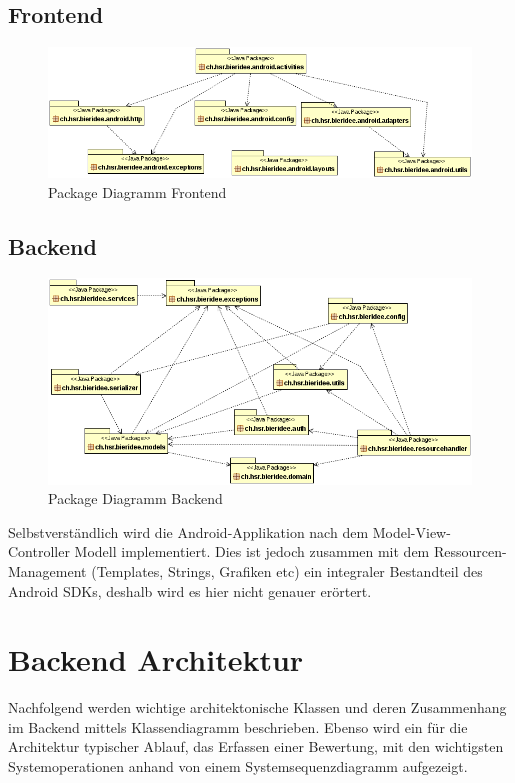 \documentclass[10pt,a4paper]{scrartcl}
\begin{document}
\subsection{Frontend}
\begin{figure}[H]
	\includegraphics[width=\textwidth]{Package-Diagramm-Front.png}
	\caption{Package Diagramm Frontend}
	\label{fig:package_diagram}
\end{figure}


\subsection{Backend}
\begin{figure}[H]
	\includegraphics[width=\textwidth]{Package-Diagramm-Back.png}
	\caption{Package Diagramm Backend}
	\label{fig:package_diagram}
\end{figure}

Selbstverständlich wird die Android-Applikation nach dem Model-View-Controller Modell implementiert.
Dies ist jedoch zusammen mit dem Ressourcen-Management (Templates, Strings, Grafiken etc) ein
integraler Bestandteil des Android SDKs, deshalb wird es hier nicht genauer erörtert.


\newpage
\section{Backend Architektur}
Nachfolgend werden wichtige architektonische Klassen und deren Zusammenhang im Backend mittels Klassendiagramm beschrieben. Ebenso wird ein für die Architektur typischer Ablauf, das Erfassen einer Bewertung, mit den wichtigsten Systemoperationen anhand von einem Systemsequenzdiagramm aufgezeigt.
\end{document}
